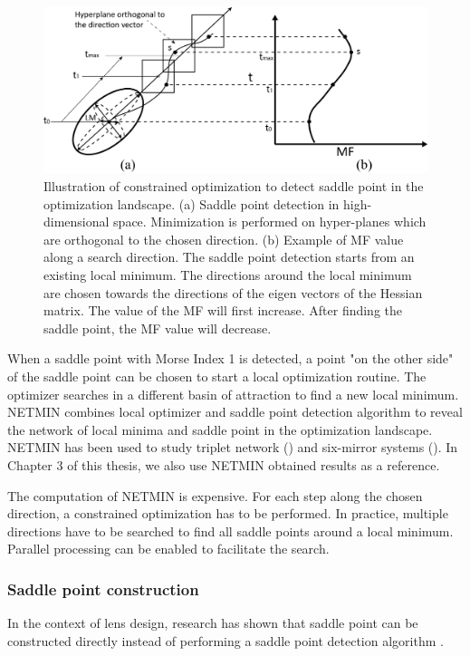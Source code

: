 \begin{figure}
    \centering
    \includegraphics[scale=0.58]{chapter-1/figures/spd_plot.png}
    \caption{Illustration of constrained optimization to detect saddle point in the optimization landscape. (a) Saddle point detection in high-dimensional space. Minimization is performed on hyper-planes which are orthogonal to the chosen direction. (b) Example of MF value along a search direction. The saddle point detection starts from an existing local minimum. The directions around the local minimum are chosen towards the directions of the eigen vectors of the Hessian matrix. The value of the MF will first increase. After finding the saddle point, the MF value will decrease. }
    \label{fig: spd_illustration}
\end{figure} 

When a saddle point with Morse Index 1 is detected, a point "on the other side" of the saddle point can be chosen to start a local optimization routine. The optimizer searches in a different basin of attraction to find a new local minimum. NETMIN combines local optimizer and saddle point detection algorithm to reveal the network of local minima and saddle point in the optimization landscape. NETMIN has been used to study triplet network (\cite{PascalTriplet2009}) and six-mirror systems (\cite{MarinescuSPD07}). In Chapter 3 of this thesis, we also use NETMIN obtained results as a reference. 

The computation of NETMIN is expensive. For each step along the chosen direction, a constrained optimization has to be performed. In practice, multiple directions have to be searched to find all saddle points around a local minimum. Parallel processing can be enabled to facilitate the search.  


\subsubsection{Saddle point construction }
In the context of lens design, research has shown that saddle point can be constructed directly instead of performing a saddle point detection algorithm \cite{vanTurnhoutThesis2009} \cite{MVTurnhoutSPC15}. 

